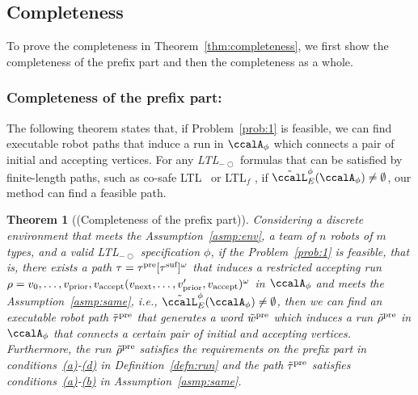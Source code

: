 \documentclass[Afour,sageh,times]{sagej}
\newtheorem{thm}{Theorem}[section]
\newcommand{\ltl}{ {\it LTL}$_{-\bigcirc}$ }
\newcommand{\auto}[1]{\ccalA_{\textup{#1}}}
\newcommand{\autop}{\ccalA_{\phi}}
\newcommand{\vertex}[1]{v_{\textup{#1}}}
\begin{document}
{\subsection{Completeness}\label{app:completeness}
To prove the completeness in Theorem~\ref{thm:completeness}, we first show the completeness of the prefix part and then the completeness as a whole.
\subsubsection{Completeness of the prefix part:}
The following theorem states that, if Problem~\ref{prob:1} is feasible, we can find executable robot paths that induce a run in $\autop$ which connects a pair of initial and accepting vertices.  For any \ltl formulas that can be satisfied by finite-length paths, such as co-safe LTL~\citep{kupferman2001model} or LTL$_f$ \citep{de2013linear}, if $\tilde{\ccalL}_E^\phi(\autop) \neq \emptyset$, our method can find a feasible path.
\begin{thm}[(Completeness of the prefix part)]\label{thm:prefix}
  Considering  a discrete environment that meets the Assumption~\ref{asmp:env}, a team of $n$ robots of $m$ types, and a valid \ltl specification $\phi$, if the Problem~\ref{prob:1} is feasible, that is, there exists a path $\tau = \tau^\textup{pre} [\tau^\textup{suf}]^\omega$ that induces a restricted accepting run $\rho = v_0, \ldots, \vertex{prior}, \vertex{accept} (\vertex{next}, \ldots, \vertex{prior}', \vertex{accept})^\omega$ in $\autop$ and meets the Assumption~\ref{asmp:same}, i.e.,  $\tilde{\ccalL}_E^\phi(\autop) \neq \emptyset$, then we can find an executable robot path $\tilde{\tau}^{\textup{pre}}$ that generates a word $\tilde{w}^{\textup{pre}}$ which induces a run $\tilde{\rho}^{\textup{pre}}$ in $\autop$ that connects a certain pair of initial and accepting vertices. Furthermore, the run $\tilde{\rho}^{\textup{pre}}$ satisfies the requirements on the prefix part in conditions~\hyperref[cond:a]{\it (a)}-\hyperref[cond:e]{\it (d)} in Definition~\ref{defn:run} and the path $\tilde{\tau}^{\textup{pre}}$ satisfies conditions~\hyperref[asmp:a]{\it (a)}-\hyperref[asmp:b]{\it (b)} in Assumption~\ref{asmp:same}. %

\end{thm}}
\end{document}
